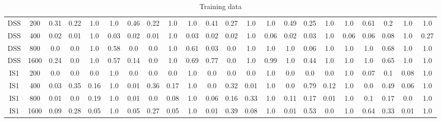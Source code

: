 \documentclass[10pt]{article}
\begin{document}
\begin{table}
\begin{tabular}{ cc||c c c c | c c c c | c c c c | c c c c| c c c c}
 					DSS & 200 & 0.31 & 0.22 & 1.0 & 1.0 & 0.46 & 0.22 & 1.0 & 1.0& 0.41 & 0.27 & 1.0 & 1.0& 0.49 & 0.25 & 1.0 & 1.0 & 0.61 & 0.2 & 1.0 & 1.0 \\ 
 					DSS & 400 & 0.02 & 0.01 & 1.0 & 0.03 & 0.02 & 0.01 & 1.0 & 0.03& 0.02 & 0.02 & 1.0 & 0.06& 0.02 & 0.03 & 1.0 & 0.06 & 0.06 & 0.08 & 1.0 & 0.27\\ 
 					DSS & 800 & 0.0 & 0.0 & 1.0 & 0.58 & 0.0 & 0.0 & 1.0 & 0.61& 0.03 & 0.0 & 1.0 & 1.0& 1.0 & 0.06 & 1.0 & 1.0 & 1.0 & 0.68 & 1.0 & 1.0\\ 
 					DSS & 1600 & 0.24 & 0.0 & 1.0 & 0.57 & 0.14 & 0.0 & 1.0 & 0.69& 0.77 & 0.0 & 1.0 & 0.99& 1.0 & 0.44 & 1.0 & 1.0 & 1.0 & 0.65 & 1.0 & 1.0\\ \hline
 					IS1 & 200 & 0.0 & 0.0 & 0.0 & 1.0 & 0.0 & 0.0 & 0.0 & 1.0& 0.0 & 0.0 & 0.0 & 1.0& 0.0 & 0.0 & 0.0 & 1.0 & 0.07 & 0.1 & 0.08 & 1.0\\ 
 					IS1 & 400 & 0.03 & 0.35 & 0.16 & 1.0 & 0.01 & 0.36 & 0.17 & 1.0& 0.0 & 0.32 & 0.01 & 1.0& 0.0 & 0.79 & 0.12 & 1.0 & 0.0 & 0.49 & 0.06 & 1.0\\ 
 					IS1 & 800 & 0.01 & 0.0 & 0.19 & 1.0 & 0.01 & 0.0 & 0.08 & 1.0& 0.06 & 0.16 & 0.33 & 1.0& 0.11 & 0.17 & 0.01 & 1.0 & 0.1 & 0.17 & 0.0 & 1.0\\ 
 					IS1 & 1600 & 0.09 & 0.28 & 0.05 & 1.0 & 0.05 & 0.27 & 0.05 & 1.0& 0.01 & 0.39 & 0.08 & 1.0& 0.01 & 0.53 & 0.0 & 1.0 & 0.64 & 0.33 & 0.01 & 1.0\\ \hline
 \hline
  \end{tabular}
  \caption{Training data}
\end{table}
\end{document}
